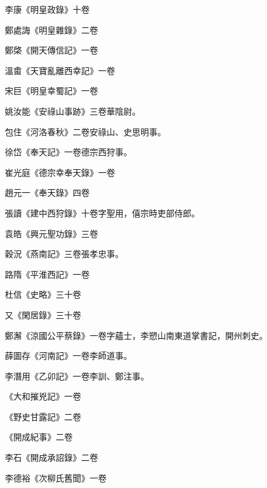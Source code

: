 \begin{pinyinscope}
 李康《明皇政錄》十卷



 鄭處誨《明皇雜錄》二卷



 鄭棨《開天傳信記》一卷



 溫畬《天寶亂離西幸記》一卷



 宋巨《明皇幸蜀記》一卷



 姚汝能《安祿山事跡》三卷華陰尉。



 包住《河洛春秋》二卷安祿山、史思明事。



 徐岱《奉天記》一卷德宗西狩事。



 崔光庭《德宗幸奉天錄》一卷



 趙元一《奉天錄》四卷



 張讀《建中西狩錄》十卷字聖用，僖宗時吏部侍郎。



 袁皓《興元聖功錄》三卷



 穀況《燕南記》三卷張孝忠事。



 路隋《平淮西記》一卷



 杜信《史略》三十卷



 又《閑居錄》三十卷



 鄭澥《涼國公平蔡錄》一卷字蘊士，李愬山南東道掌書記，開州刺史。



 薛圖存《河南記》一卷李師道事。



 李潛用《乙卯記》一卷李訓、鄭注事。



 《大和摧兇記》一卷



 《野史甘露記》二卷



 《開成紀事》二卷



 李石《開成承詔錄》二卷



 李德裕《次柳氏舊聞》一卷




\end{pinyinscope}
